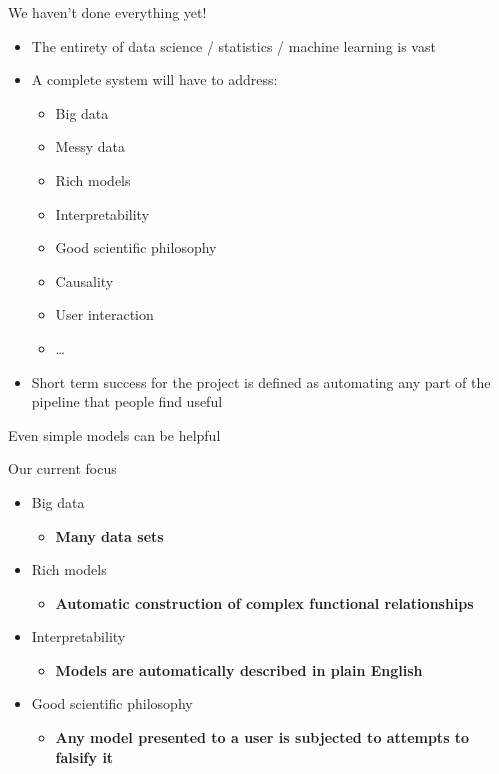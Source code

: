 \begin{frame}{We haven't done everything yet!}
  \begin{itemize}
    \item The entirety of data science / statistics / machine learning is vast
    \vspace{\baselineskip}
    \item A complete system will have to address:
    \begin{itemize}
      \item Big data
      \item Messy data
      \item Rich models
      \item Interpretability
      \item Good scientific philosophy
      \item Causality
      \item User interaction
      \item \dots
    \end{itemize}
    \vspace{\baselineskip}
    \item Short term success for the project is defined as automating any part of the pipeline that people find useful
  \end{itemize}
\end{frame}

\begin{frame}{Even simple models can be helpful}
  \begin{center}
    
  \end{center}
\end{frame}

\begin{frame}{Our current focus}
    \begin{itemize}
      \item Big data
      \begin{itemize}
        \item {\bf Many data sets}
      \end{itemize}
      \item Rich models
      \begin{itemize}
        \item {\bf Automatic construction of complex functional relationships}
      \end{itemize}
      \item Interpretability
      \begin{itemize}
        \item {\bf Models are automatically described in plain English}
      \end{itemize}
      \item Good scientific philosophy
      \begin{itemize}
        \item {\bf Any model presented to a user is subjected to attempts to falsify it}
      \end{itemize}
    \end{itemize}
\end{frame}

